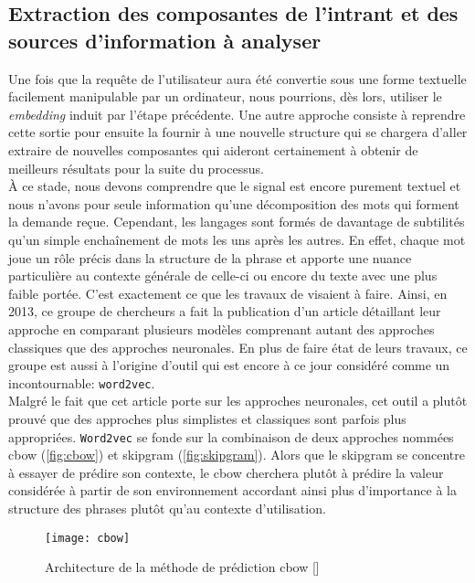 \subsection{Extraction des composantes de l'intrant et des sources d'information à analyser}
Une fois que la requête de l'utilisateur aura été convertie sous une forme textuelle facilement manipulable par un ordinateur, nous pourrions, dès lors, utiliser le \textit{embedding} induit par l'étape précédente. Une autre approche consiste à reprendre cette sortie pour ensuite la fournir à une nouvelle structure qui se chargera d'aller extraire de nouvelles composantes qui aideront certainement à obtenir de meilleurs résultats pour la suite du processus. \\

À ce stade, nous devons comprendre que le signal est encore purement textuel et nous n'avons pour seule information qu'une décomposition des mots qui forment la demande reçue. Cependant, les langages sont formés de davantage de subtilités qu'un simple enchaînement de mots les uns après les autres. En effet, chaque mot joue un rôle précis dans la structure de la phrase et apporte une nuance particulière au contexte générale de celle-ci ou encore du texte avec une plus faible portée. C'est exactement ce que les travaux de \cite{word2vec} visaient à faire. Ainsi, en 2013, ce groupe de chercheurs a fait la publication d'un article détaillant leur approche en comparant plusieurs modèles comprenant autant des approches classiques que des approches neuronales. En plus de faire état de leurs travaux, ce groupe est aussi à l'origine d'outil qui est encore à ce jour considéré comme un incontournable: \texttt{word2vec}. \\

Malgré le fait que cet article porte sur les approches neuronales, cet outil a plutôt prouvé que des approches plus simplistes et classiques sont parfois plus appropriées. \texttt{Word2vec} se fonde sur la combinaison de deux approches nommées \gls{cbow} (\autoref{fig:cbow}) et \gls{skipgram} (\autoref{fig:skipgram}). Alors que le \gls{skipgram} se concentre à essayer de prédire son contexte, le \gls{cbow} cherchera plutôt à prédire la valeur considérée à partir de son environnement accordant ainsi plus d’importance à la structure des phrases plutôt qu’au contexte d’utilisation.\\

\begin{figure}[ht]
  \centering
  \texttt{[image: cbow]}
  \caption{Architecture de la méthode de prédiction \gls{cbow} []}
  \label{fig:cbow}
\end{figure}

